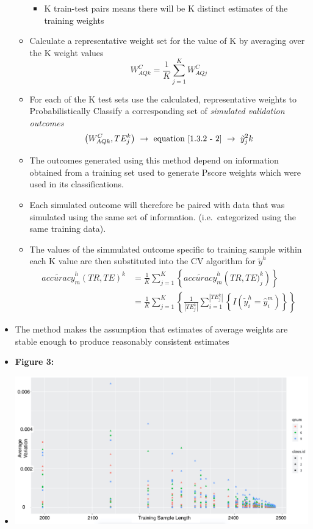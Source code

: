 \documentclass[12pt,]{article}
\providecommand{\tightlist}{%
  \setlength{\itemsep}{0pt}\setlength{\parskip}{0pt}}
\begin{document}
\begin{itemize}
\begin{itemize}
    \begin{itemize}
    \tightlist
    \item
      K train-test pairs means there will be K distinct estimates of the
      training weights
    \end{itemize}
  \item
    Calculate a representative weight set for the value of K by
    averaging over the K weight values
    \[W_{AQk}^{C}=\frac{1}{K}\sum_{j=1}^{K} W_{AQj}^{C}\]
  \item
    For each of the K test sets use the calculated, representative
    weights to Probabilistically Classify a corresponding set of
    \textit{simulated validation outcomes}
    \[\left(W_{AQk}^{C}, TE_{j}^{k}\right)  \ \rightarrow \ \text{equation} \ \eqref{1.3.2 - 2} \ \rightarrow \   \tilde{y}_{j}^2{k}\]
  \item
    The outcomes generated using this method depend on information
    obtained from a training set used to generate Pscore weights which
    were used in its classifications.\\
  \item
    Each simulated outcome will therefore be paired with data that was
    simulated using the same set of information. (i.e.~categorized using
    the same training data).
  \item
    The values of the simmulated outcome specific to training sample
    within each K value are then substituted into the CV algorithm for
    \(\tilde{y}^{h}\) \begin{eqnarray*}
      \tilde{accuracy}_{m}^{h}\left(TR, TE \right)^{k} &= \frac{1}{K}\sum_{j=1}^{K} \left \{\tilde{accuracy}_{m}^{h} \left(TR, TE)_{j}^{k}   \right)   \right \} \\
      &= \frac{1}{K}\sum_{j=1}^{K} \left \{ \frac{1}{|TE_{j}^{k}|} \sum_{i=1}^{|TE_{j}^{k}|} \left \{ I\left(\tilde{y}_{i}^{h}=\hat{y}_{i}^{m} \right) \right \}   \right \}
    \end{eqnarray*}
  \end{itemize}
\item
  The method makes the assumption that estimates of average weights are
  stable enough to produce reasonably consistent estimates
\item
  \textbf{Figure 3:}
\item
  \includegraphics{VariancePlot.jpg}

\end{itemize}
\end{document}
